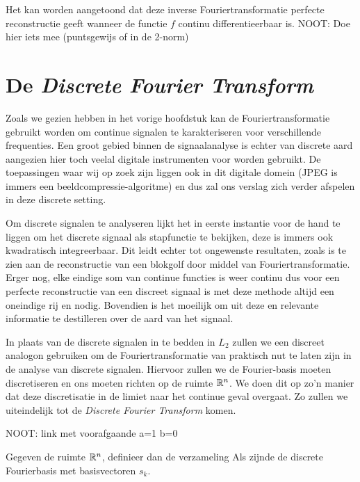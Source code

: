 Het kan worden aangetoond dat deze inverse Fouriertransformatie perfecte reconstructie geeft wanneer de functie
$f$ continu differentieerbaar is.\cite{fourier-rec} 
NOOT: Doe hier iets mee (puntsgewijs of in de 2-norm)

\section{De \emph{Discrete Fourier Transform}}
Zoals we gezien hebben in het vorige hoofdstuk kan de Fouriertransformatie gebruikt worden om continue signalen te karakteriseren voor verschillende frequenties. Een groot gebied binnen de signaalanalyse is echter van discrete aard aangezien hier toch veelal digitale instrumenten voor worden gebruikt. De toepassingen waar wij op zoek zijn liggen ook in dit digitale domein (JPEG is immers een beeldcompressie-algoritme) en dus zal ons verslag zich verder afspelen in deze discrete setting.

Om discrete signalen te analyseren lijkt het in eerste instantie voor de hand te liggen om het discrete signaal als stapfunctie te bekijken, deze is immers ook kwadratisch integreerbaar. Dit leidt echter tot ongewenste resultaten, zoals is te zien aan de reconstructie van een blokgolf door middel van Fouriertransformatie. Erger nog, elke eindige som van continue functies is weer continu dus voor een perfecte reconstructie van een discreet signaal is met deze methode altijd een oneindige rij \coefficient en nodig. Bovendien is het moeilijk om uit deze \coefficient en relevante informatie te destilleren over de aard van het signaal.

In plaats van de discrete signalen in te bedden in $L_2$ zullen we een discreet analogon gebruiken om de Fouriertransformatie van praktisch nut te laten zijn in de analyse van discrete signalen. 
Hiervoor zullen we de Fourier-basis moeten discretiseren en ons moeten richten op de ruimte $\mathbb{R}^n$.
We doen dit op zo'n manier dat deze discretisatie in de limiet naar het continue geval overgaat. 
Zo zullen we uiteindelijk tot de \emph{Discrete Fourier Transform} komen.

NOOT: link met voorafgaande a=1 b=0

\begin{definitie} Gegeven de ruimte $\mathbb{R}^n$, definieer dan de verzameling
Als zijnde de discrete Fourierbasis met basisvectoren $s_k$.
\end{definitie}

